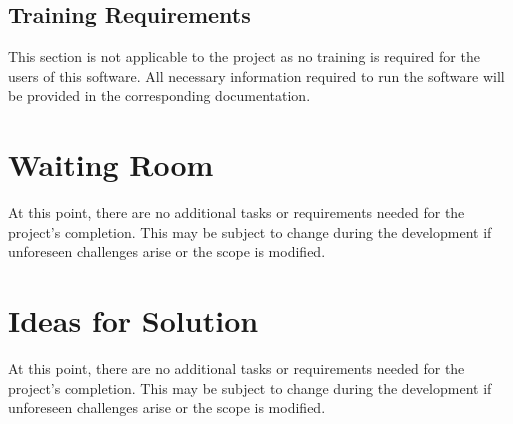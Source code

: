 \documentclass[12pt]{article}
\newcommand{\lips}{\textit{Insert your content here.}}
\begin{document}
\subsection{Training Requirements}
This section is not applicable to the project as no training is required for the users of this software. All necessary information required to run the software will be provided in the corresponding documentation.
\section{Waiting Room}
At this point, there are no additional tasks or requirements needed for the project's completion. This may be subject to change during the development if unforeseen challenges arise or the scope is modified.

\section{Ideas for Solution}
At this point, there are no additional tasks or requirements needed for the project's completion. This may be subject to change during the development if unforeseen challenges arise or the scope is modified.
\end{document}
